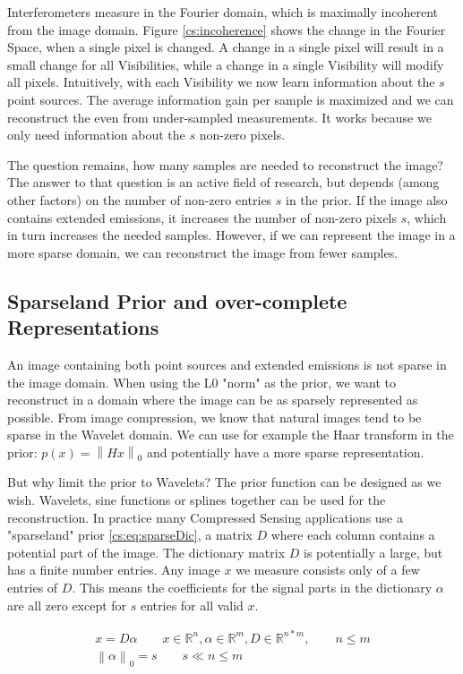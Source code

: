 Interferometers measure in the Fourier domain, which is maximally incoherent from the image domain. Figure \ref{cs:incoherence} shows the change in the Fourier Space, when a single pixel is changed. A change in a single pixel will result in a small change for all Visibilities, while a change in a single Visibility will modify all pixels. Intuitively, with each Visibility we now learn information about the $s$ point sources. The average information gain per sample is maximized and we can reconstruct the even from under-sampled measurements. It works because we only need information about the $s$ non-zero pixels.

The question remains, how many samples are needed to reconstruct the image? The answer to that question is an active field of research\cite{candes2011probabilistic}, but depends (among other factors) on the number of non-zero entries $s$ in the prior. If the image also contains extended emissions, it increases the number of non-zero pixels $s$, which in turn increases the needed samples. However, if we can represent the image in a more sparse domain, we can reconstruct the image from fewer samples.


\subsection{Sparseland Prior and over-complete Representations}
An image containing both point sources and extended emissions is not sparse in the image domain. When using the L0 "norm" as the prior, we want to reconstruct in a domain where the image can be as sparsely represented as possible. From image compression, we know that natural images tend to be sparse in the Wavelet domain. We can use for example the Haar transform in the prior: $p(x) = \left \| Hx \right \|_0$ and potentially have a more sparse representation.

But why limit the prior to Wavelets? The prior function can be designed as we wish. Wavelets, sine functions or splines together can be used for the reconstruction. In practice many Compressed Sensing applications use a "sparseland" prior \eqref{cs:eq:sparseDic}, a matrix $D$ where each column contains a potential part of the image. The dictionary matrix $D$ is potentially a large, but has a finite number entries. Any image $x$ we measure consists only of a few entries of $D$. This means the coefficients for the signal parts in the dictionary $\alpha$ are all zero except for $s$ entries for all valid $x$.

\begin{equation} \label{cs:eq:sparseDic}
\begin{split}
x = D \alpha  \qquad  x \in \mathbb{R}^{n}, \alpha \in \mathbb{R}^{m}, D \in \mathbb{R}^{n*m}, \qquad n \leq m \\
\left \| \alpha \right \|_0 = s \qquad s \ll n \leq m
\end{split}
\end{equation}

